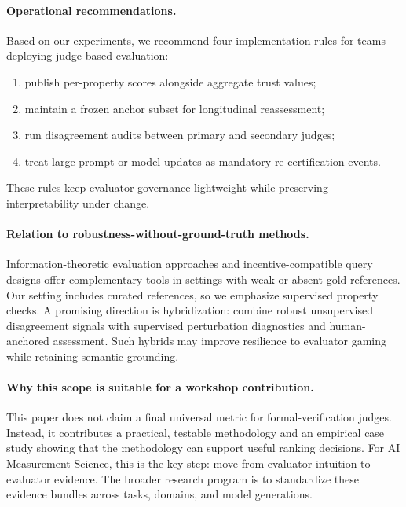 \paragraph{Operational recommendations.}
Based on our experiments, we recommend four implementation rules for teams deploying judge-based evaluation:
\begin{enumerate}
\item publish per-property scores alongside aggregate trust values;
\item maintain a frozen anchor subset for longitudinal reassessment;
\item run disagreement audits between primary and secondary judges;
\item treat large prompt or model updates as mandatory re-certification events.
\end{enumerate}
These rules keep evaluator governance lightweight while preserving interpretability under change.

\paragraph{Relation to robustness-without-ground-truth methods.}
Information-theoretic evaluation approaches and incentive-compatible query designs offer complementary tools in settings with weak or absent gold references.
Our setting includes curated references, so we emphasize supervised property checks.
A promising direction is hybridization: combine robust unsupervised disagreement signals with supervised perturbation diagnostics and human-anchored assessment.
Such hybrids may improve resilience to evaluator gaming while retaining semantic grounding.

\paragraph{Why this scope is suitable for a workshop contribution.}
This paper does not claim a final universal metric for formal-verification judges.
Instead, it contributes a practical, testable methodology and an empirical case study showing that the methodology can support useful ranking decisions.
For AI Measurement Science, this is the key step: move from evaluator intuition to evaluator evidence.
The broader research program is to standardize these evidence bundles across tasks, domains, and model generations.

